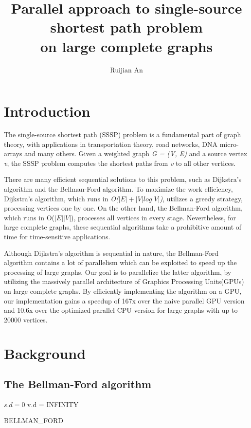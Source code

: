 \documentclass[twocolumn]{article}
\title{Parallel approach to single-source shortest path problem\\ on large complete graphs}
\author{Ruijian An}
\begin{document}
\date{}
\maketitle

\section{Introduction}
The single-source shortest path (SSSP) problem is a fundamental part of graph theory, with applications in transportation theory, road networks, DNA micro-arrays and many others. Given a weighted graph \emph{G = (V, E)} and a source vertex \emph{v}, the SSSP problem computes the shortest paths from \emph{v} to all other vertices. 

There are many efficient sequential solutions to this problem, such as Dijkstra's algorithm and the Bellman-Ford algorithm\cite{corman}. To maximize the work efficiency, Dijkstra's algorithm, which runs in \emph{O($|E| + |V|log|V|$)}, utilizes a greedy strategy, processing vertices one by one. On the other hand, the Bellman-Ford algorithm, which runs in O(\emph{$|E||V|$}), processes all vertices in every stage. Nevertheless, for large complete graphs, these sequential algorithms take a prohibitive amount of time for time-sensitive applications.

Although Dijkstra's algorithm is sequential in nature, the Bellman-Ford algorithm contains a lot of parallelism which can be exploited to speed up the processing of large graphs. Our goal is to parallelize the latter algorithm, by utilizing the massively parallel architecture of Graphics Processing Units(GPUs) on large complete graphs. By efficiently implementing the algorithm on a GPU, our implementation gains a speedup of 167x over the naive parallel GPU version and 10.6x over the optimized parallel CPU version for large graphs with up to 20000 vertices.

\section{Background}
\subsection{The Bellman-Ford algorithm}
\begin{algorithm}
\SetAlgoLined
{}
$s.d = 0$\;
 {
  v.d = INFINITY\;
}
 \caption{BELLMAN\_FORD}
\end{algorithm}
\end{document}
